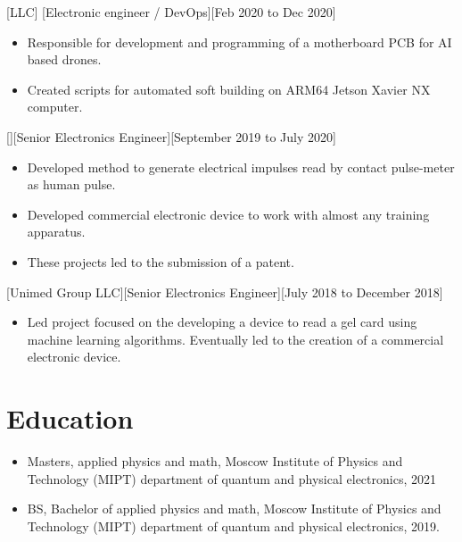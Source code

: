 \documentclass{article}
\begin{document}
[LLC]
[Electronic engineer / DevOps][Feb 2020 to Dec 2020]
 
\begin{itemize}
\item Responsible for development and programming of a motherboard PCB for AI based drones.
\item Created scripts for automated soft building on ARM64 Jetson Xavier NX computer.
\end{itemize}
 
 
[][Senior Electronics Engineer][September 2019 to July 2020]
 
\begin{itemize}
\item Developed method to generate electrical impulses read by contact pulse-meter as human pulse.
\item Developed commercial electronic device to work with almost any training apparatus.
\item These projects led to the submission of a patent.
\end{itemize}
 
[Unimed Group LLC][Senior Electronics Engineer][July 2018 to December 2018]
 
\begin{itemize}
\item Led project focused on the developing a device to read a gel card using machine learning algorithms. Eventually led to the creation of a commercial electronic device.
\end{itemize}
 
 
\section{Education}
 
\begin{itemize}
\item Masters, applied physics and math, Moscow Institute of Physics and Technology (MIPT) department of quantum and physical electronics, 2021
\item BS, Bachelor of applied physics and math, Moscow Institute of Physics and Technology (MIPT) department of quantum and physical electronics, 2019.
\end{itemize}
 
\end{document}
